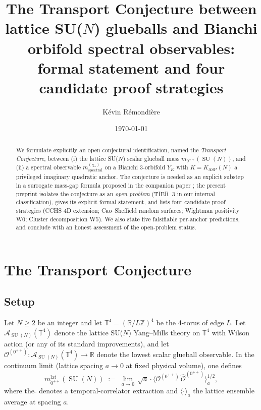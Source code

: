 \documentclass[11pt,a4paper,reqno]{amsart}
\title[Transport Conjecture]
  {The Transport Conjecture between lattice SU($N$) glueballs and Bianchi
   orbifold spectral observables: formal statement and four candidate proof
   strategies}
\author[K.~R\'emondi\`ere]{K\'evin R\'emondi\`ere}
\date{\today}
\theoremstyle{definition}
\DeclareMathOperator{\SU}{SU}
\newcommand{\YK}{Y_K}
\newcommand{\KASP}{K_{\mathrm{ASP}}}
\newcommand{\ZZ}{\mathbb{Z}}
\newcommand{\RR}{\mathbb{R}}
\newcommand{\TT}{\mathbb{T}}
\begin{document}
\begin{abstract}
We formulate explicitly an open conjectural identification, named the
\emph{Transport Conjecture}, between (i) the lattice SU($N$) scalar glueball
mass $m_{0^{++}}(\SU(N))$, and (ii) a spectral observable
$m^{(\chi_*)}_{\mathrm{spectral}}$ on a Bianchi 3-orbifold $\YK$ with
$K = \KASP(N)$ a privileged imaginary quadratic anchor. The conjecture is
needed as an explicit substep in a surrogate mass-gap formula proposed in the
companion paper \cite{Remondiere2026RouteB}; the present preprint isolates
the conjecture as an \emph{open problem} (TIER~3 in our internal
classification), gives its explicit formal statement, and lists four
candidate proof strategies (CCHS 4D extension; Cao--Sheffield random surfaces;
Wightman positivity W0; Cluster decomposition W5). We also state five
falsifiable per-anchor predictions, and conclude with an honest assessment
of the open-problem status.
\end{abstract}

\maketitle

\section{The Transport Conjecture}\label{sec:conjecture}

\subsection{Setup}\label{ss:setup}

Let $N\ge 2$ be an integer and let $\TT^4 = (\RR/L\ZZ)^4$ be the 4-torus of edge $L$. Let $\mathcal{A}_{\SU(N)}(\TT^4)$ denote the lattice SU($N$) Yang--Mills theory on $\TT^4$ with Wilson action (or any of its standard improvements), and let $\mathcal{O}^{(0^{++})} : \mathcal{A}_{\SU(N)}(\TT^4) \to \RR$ denote the lowest scalar glueball observable. In the continuum limit (lattice spacing $a \to 0$ at fixed physical volume), one defines
\begin{equation}\label{eq:mlat}
   m_{0^{++}}^{\mathrm{lat}}(\SU(N))
   \;:=\; \lim_{a\to 0}\, \sqrt{a}\cdot\bigl\langle \mathcal{O}^{(0^{++})}\,\hat{\mathcal{O}}^{(0^{++})}\bigr\rangle^{1/2}_{a},
\end{equation}
where the $\hat{}$ denotes a temporal-correlator extraction and $\langle\cdot\rangle_a$ the lattice ensemble average at spacing $a$.
\end{document}
